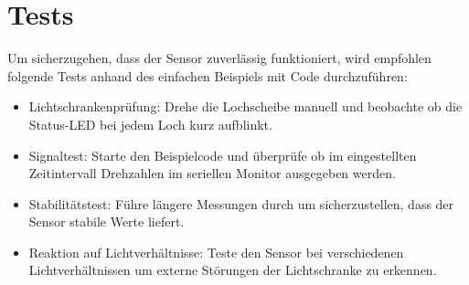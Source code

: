 \section{Tests}

Um sicherzugehen, dass der Sensor zuverlässig funktioniert, wird empfohlen folgende Tests anhand des einfachen Beispiels mit Code durchzuführen:

\begin{itemize}
	\item Lichtschrankenprüfung: Drehe die Lochscheibe manuell und beobachte ob die Status-LED bei jedem Loch kurz aufblinkt.
	\item Signaltest: Starte den Beispielcode und überprüfe ob im eingestellten Zeitintervall Drehzahlen im seriellen Monitor ausgegeben werden.
	\item Stabilitätstest: Führe längere Messungen durch um sicherzustellen, dass der Sensor stabile Werte liefert.
	\item Reaktion auf Lichtverhältnisse: Teste den Sensor bei verschiedenen Lichtverhältnissen um externe Störungen der Lichtschranke zu erkennen.
\end{itemize}


